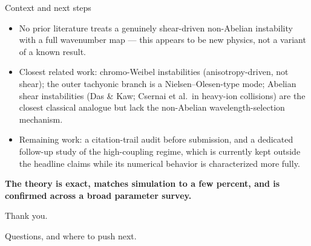 \documentclass[aspectratio=169,11pt]{beamer}
\begin{document}
\begin{frame}{Context and next steps}
\begin{itemize}
\item No prior literature treats a genuinely shear-driven non-Abelian
instability with a full wavenumber map — this appears to be new physics, not
a variant of a known result.
\item Closest related work: chromo-Weibel instabilities (anisotropy-driven,
not shear); the outer tachyonic branch is a Nielsen--Olesen-type mode;
Abelian shear instabilities (Das \& Kaw; Csernai et al.\ in heavy-ion
collisions) are the closest classical analogue but lack the non-Abelian
wavelength-selection mechanism.
\item Remaining work: a citation-trail audit before submission, and a
dedicated follow-up study of the high-coupling regime, which is currently
kept outside the headline claims while its numerical behavior is
characterized more fully.
\end{itemize}
\vspace{0.2em}
\centering\Large\textbf{The theory is exact, matches simulation to a few
percent, and is confirmed across a broad parameter survey.}
\end{frame}

\begin{frame}
\centering
\Huge Thank you.
\vspace{0.15em}

\normalsize\normalfont Questions, and where to push next.
\end{frame}
\end{document}
